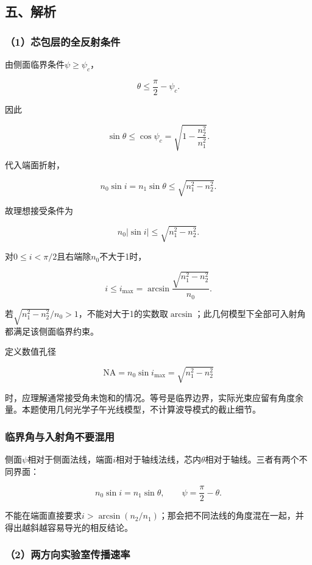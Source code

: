 \documentclass[12pt,a4paper,fontset=fandol]{ctexart}
\begin{document}
\subsection{五、解析}\label{ux4e94ux89e3ux6790-5}

\subsubsection{（1）芯包层的全反射条件}\label{ux82afux5305ux5c42ux7684ux5168ux53cdux5c04ux6761ux4ef6}

由侧面临界条件\(\psi\geq\psi_c\)，

\[
\theta\leq\frac\pi2-\psi_c.
\]

因此

\[
\sin\theta\leq\cos\psi_c
=\sqrt{1-\frac{n_2^2}{n_1^2}}.
\]

代入端面折射，

\[
n_0\sin i=n_1\sin\theta
\leq\sqrt{n_1^2-n_2^2}.
\]

故理想接受条件为

\[
\boxed{n_0|\sin i|\leq\sqrt{n_1^2-n_2^2}}.
\]

对\(0\leq i<\pi/2\)且右端除\(n_0\)不大于1时，

\[
\boxed{
i\leq i_{\max}
=\arcsin\frac{\sqrt{n_1^2-n_2^2}}{n_0}}.
\]

若\(\sqrt{n_1^2-n_2^2}/n_0>1\)，不能对大于1的实数取\(\arcsin\)；此几何模型下全部可入射角都满足该侧面临界约束。

定义数值孔径

\[
\mathrm{NA}=n_0\sin i_{\max}
=\sqrt{n_1^2-n_2^2}
\]

时，应理解通常接受角未饱和的情况。等号是临界边界，实际光束应留有角度余量。本题使用几何光学子午光线模型，不计算波导模式的截止细节。

\subsubsection{临界角与入射角不要混用}\label{ux4e34ux754cux89d2ux4e0eux5165ux5c04ux89d2ux4e0dux8981ux6df7ux7528}

侧面\(\psi\)相对于侧面法线，端面\(i\)相对于轴线法线，芯内\(\theta\)相对于轴线。三者有两个不同界面：

\[
n_0\sin i=n_1\sin\theta,\qquad
\psi=\frac\pi2-\theta.
\]

不能在端面直接要求\(i>\arcsin(n_2/n_1)\)；那会把不同法线的角度混在一起，并得出越斜越容易导光的相反结论。

\subsubsection{（2）两方向实验室传播速率}\label{ux4e24ux65b9ux5411ux5b9eux9a8cux5ba4ux4f20ux64adux901fux7387}
\end{document}
